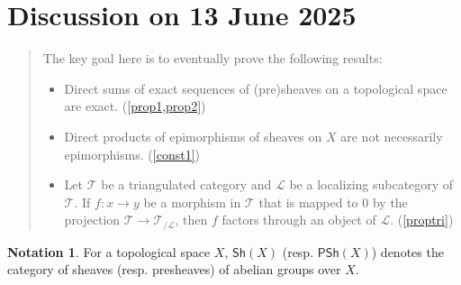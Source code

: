 \documentclass[oneside,11pt]{amsart}
\theoremstyle{definition}
\newtheorem{notn}[thm]{Notation}
\theoremstyle{remark}
\begin{document}
\section*{Discussion on 13 June 2025} 
\begin{quotation}
 The key goal here is to eventually prove the following results:
 \begin{itemize}
	 \item Direct sums of exact sequences of (pre)sheaves on a topological space are exact. (\cref{prop1,prop2})
	 \item Direct products of epimorphisms of sheaves on $X$ are not necessarily epimorphisms. (\cref{const1})
	 \item Let $\mathscr{T} $ be a triangulated category and $\mathscr{L} $ be a localizing subcategory of $\mathscr{T} $. If $f:x\rightarrow y$ be a morphism in $\mathscr{T} $ that is mapped to $0$ by the projection $\mathscr{T} \rightarrow \mathscr{T}_{/\mathscr{L}}   $, then $f$ factors through an object of $\mathscr{L} $. (\cref{proptri})
 \end{itemize}
\end{quotation}
\begin{notn}
For a topological space $X$, $\textsf{Sh}(X)$ (resp. $\textsf{PSh}(X)$) denotes the category of sheaves (resp. presheaves) of abelian groups over $X$.      
\end{notn}
\end{document}
